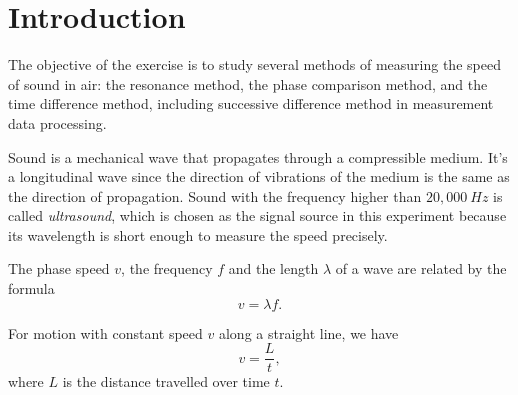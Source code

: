 \section{Introduction}

The objective of the exercise is to study several methods of measuring the
speed of sound in air: the resonance method, the phase comparison method, and
the time difference method, including successive difference method in
measurement data processing.
    
Sound is a mechanical wave that propagates through a compressible medium.
It's a longitudinal wave since the direction of vibrations of the medium is
the same as the direction of propagation. Sound with the frequency higher
than $20,000\ Hz$ is called \emph{ultrasound}, which is chosen as the signal
source in this experiment because its wavelength is short enough to measure
the speed precisely.
    
The phase speed $v$, the frequency $f$ and the length $\lambda$ of a wave are
related by the formula 
\begin{equation}\label{vlf}
    v=\lambda f.
\end{equation}

For motion with constant speed $v$ along a straight line, we have 
\begin{equation}\label{vlt}
    v=\frac{L}{t},
\end{equation}
where $L$ is the distance travelled over time $t$. 